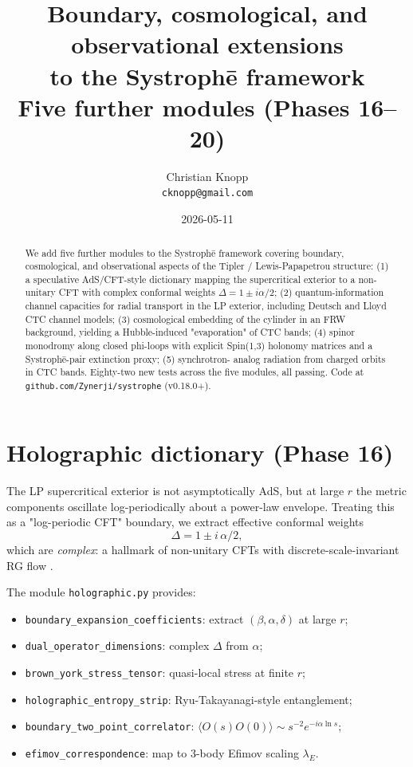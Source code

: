 \documentclass[11pt,a4paper]{article}
\title{\bfseries Boundary, cosmological, and observational extensions\\
to the Systroph\=e framework\\
\large Five further modules (Phases 16--20)}
\author{Christian Knopp\\\texttt{cknopp@gmail.com}}
\date{2026-05-11}
\begin{document}
\maketitle

\begin{abstract}
We add five further modules to the Systroph\=e framework
\cite{Knopp2026Systrophe,Knopp2026QFTCS,Knopp2026Ext1,Knopp2026Ext2}
covering boundary, cosmological, and observational aspects of the
Tipler / Lewis-Papapetrou structure: (1) a speculative AdS/CFT-style
dictionary mapping the supercritical exterior to a non-unitary CFT
with complex conformal weights $\Delta = 1 \pm i\alpha/2$;
(2) quantum-information channel capacities for radial transport in
the LP exterior, including Deutsch and Lloyd CTC channel models;
(3) cosmological embedding of the cylinder in an FRW background,
yielding a Hubble-induced "evaporation" of CTC bands; (4) spinor
monodromy along closed phi-loops with explicit Spin(1,3) holonomy
matrices and a Systroph\=e-pair extinction proxy; (5) synchrotron-
analog radiation from charged orbits in CTC bands. Eighty-two new
tests across the five modules, all passing. Code at
\texttt{github.com/Zynerji/systrophe} (v0.18.0+).
\end{abstract}

\section{Holographic dictionary (Phase 16)}

The LP supercritical exterior is not asymptotically AdS, but at
large $r$ the metric components oscillate log-periodically about a
power-law envelope. Treating this as a "log-periodic CFT" boundary,
we extract effective conformal weights
\[
\Delta = 1 \pm i\,\alpha/2,
\]
which are \emph{complex}: a hallmark of non-unitary CFTs with
discrete-scale-invariant RG flow \cite{Sornette1998,Faulkner2010}.

The module \texttt{holographic.py} provides:
\begin{itemize}
\item \texttt{boundary\_expansion\_coefficients}: extract $(\beta, \alpha, \delta)$ at large $r$;
\item \texttt{dual\_operator\_dimensions}: complex $\Delta$ from $\alpha$;
\item \texttt{brown\_york\_stress\_tensor}: quasi-local stress at finite $r$;
\item \texttt{holographic\_entropy\_strip}: Ryu-Takayanagi-style entanglement;
\item \texttt{boundary\_two\_point\_correlator}: $\langle O(s) O(0)\rangle \sim s^{-2}e^{-i\alpha\ln s}$;
\item \texttt{efimov\_correspondence}: map to 3-body Efimov scaling $\lambda_E$.
\end{itemize}
\end{document}
